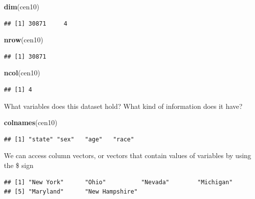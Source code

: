\documentclass[
]{book}
\newenvironment{Shaded}{\begin{snugshade}}{\end{snugshade}}
\newcommand{\KeywordTok}[1]{\textcolor[rgb]{0.13,0.29,0.53}{\textbf{#1}}}
\newcommand{\NormalTok}[1]{#1}
\newcommand{\OperatorTok}[1]{\textcolor[rgb]{0.81,0.36,0.00}{\textbf{#1}}}
\theoremstyle{definition}
\theoremstyle{definition}
\theoremstyle{definition}
\theoremstyle{definition}
\theoremstyle{remark}
\begin{document}
\begin{Shaded}
\begin{Highlighting}[]
\KeywordTok{dim}\NormalTok{(cen10)}
\end{Highlighting}
\end{Shaded}

\begin{verbatim}
## [1] 30871     4
\end{verbatim}

\begin{Shaded}
\begin{Highlighting}[]
\KeywordTok{nrow}\NormalTok{(cen10)}
\end{Highlighting}
\end{Shaded}

\begin{verbatim}
## [1] 30871
\end{verbatim}

\begin{Shaded}
\begin{Highlighting}[]
\KeywordTok{ncol}\NormalTok{(cen10)}
\end{Highlighting}
\end{Shaded}

\begin{verbatim}
## [1] 4
\end{verbatim}

What variables does this dataset hold? What kind of information does it have?

\begin{Shaded}
\begin{Highlighting}[]
\KeywordTok{colnames}\NormalTok{(cen10)}
\end{Highlighting}
\end{Shaded}

\begin{verbatim}
## [1] "state" "sex"   "age"   "race"
\end{verbatim}

We can access column vectors, or vectors that contain values of variables by using the \$ sign

\begin{Shaded}
\end{Shaded}

\begin{verbatim}
## [1] "New York"      "Ohio"          "Nevada"        "Michigan"     
## [5] "Maryland"      "New Hampshire"
\end{verbatim}
\end{document}
